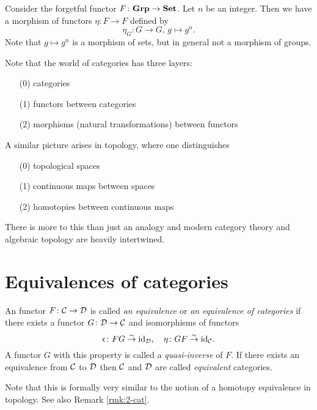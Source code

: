 \begin{example}
Consider the forgetful functor $F\colon \mathbf{Grp} \to \mathbf{Set}$. Let $n$ be an integer. Then we have a morphism of functors $\eta\colon F \to F$ defined by
\[
	\eta_G \colon G \to G,\,g \mapsto g^n.
\]
Note that $g\mapsto g^n$ is a morphism of sets, but in general not a morphism of groups.
\end{example}

\begin{remark}\label{rmk:2-cat}
Note that the world of categories has three layers:
\begin{enumerate}
\item[(0)] categories
\item[(1)] functors between categories
\item[(2)] morphisms (natural transformations) between functors
\end{enumerate}
A similar picture arises in topology, where one distinguishes
\begin{enumerate}
\item[(0)] topological spaces
\item[(1)] continuous maps between spaces
\item[(2)] homotopies between continuous maps
\end{enumerate}
There is more to this than just an analogy and modern category theory and algebraic topology are heavily intertwined.

\end{remark}


\section{Equivalences of categories}




\begin{definition}
An functor $F\colon {\mathcal{C}} \to {\mathcal{D}}$ is called \emph{an equivalence} or \emph{an equivalence of categories} if there exists a functor $G\colon {\mathcal{D}} \to {\mathcal{C}}$ and isomorphisms of functors
\[
	\epsilon\colon FG \overset{\sim}{\to} {\rm id}_{\mathcal{D}},\quad \eta\colon GF\overset{\sim}{\to} {\rm id}_{\mathcal{C}}.
\]
A functor $G$ with this property is called a \emph{quasi-inverse} of $F$. If there exists an equivalence from ${\mathcal{C}}$ to ${\mathcal{D}}$ then ${\mathcal{C}}$ and ${\mathcal{D}}$ are called \emph{equivalent} categories.
\end{definition}

\begin{remark}
Note that this is formally very similar to the notion of a homotopy equivalence in topology. See also Remark \ref{rmk:2-cat}.
\end{remark}

